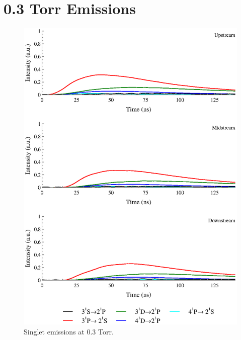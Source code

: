 \section{0.3 Torr Emissions}
\begin{figure}
  \centering
  \includegraphics{./chapters/extraem/figures/03torr_s.eps}
  \caption{Singlet emissions at 0.3 Torr.}
\end{figure}
